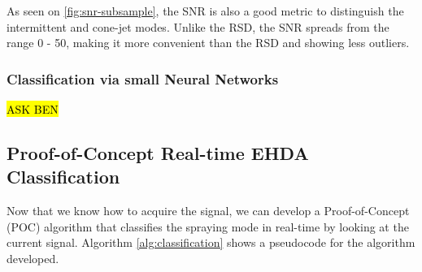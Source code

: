 \documentclass[oneside,12pt]{article}
\begin{document}
As seen on \autoref{fig:snr-subsample}, the SNR is also a good metric to distinguish the intermittent and cone-jet modes.
Unlike the RSD, the SNR spreads from the range 0 - 50, making it more convenient than the RSD and showing less outliers. 

\subsubsection{Classification via small Neural Networks}

\hl{ASK BEN}

\subsection{Proof-of-Concept Real-time EHDA Classification}\label{sec:classification-algorithm}

Now that we know how to acquire the signal, we can develop a Proof-of-Concept (POC)
algorithm that classifies the spraying mode in real-time by looking at the current signal.
Algorithm \ref{alg:classification} shows a pseudocode for the algorithm developed.
\end{document}
